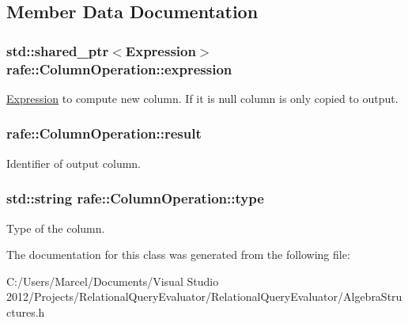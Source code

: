\subsection{Member Data Documentation}
\hypertarget{classrafe_1_1_column_operation_a33bfeb4554709f96d9945cb2148f095b}{
\subsubsection[{expression}]{\setlength{\rightskip}{0pt plus 5cm}std\+::shared\+\_\+ptr$<${\bf Expression}$>$ rafe\+::\+Column\+Operation\+::expression}}\label{classrafe_1_1_column_operation_a33bfeb4554709f96d9945cb2148f095b}
\hyperlink{classrafe_1_1_expression}{Expression} to compute new column. If it is null column is only copied to output. \hypertarget{classrafe_1_1_column_operation_a728c264bef7363a5bf0578c49654ea3b}{
\subsubsection[{result}]{ rafe\+::\+Column\+Operation\+::result}}\label{classrafe_1_1_column_operation_a728c264bef7363a5bf0578c49654ea3b}
Identifier of output column. \hypertarget{classrafe_1_1_column_operation_a1c85fd1a1f9465b33553cbdd6e641a51}{
\subsubsection[{type}]{\setlength{\rightskip}{0pt plus 5cm}std\+::string rafe\+::\+Column\+Operation\+::type}}\label{classrafe_1_1_column_operation_a1c85fd1a1f9465b33553cbdd6e641a51}
Type of the column. 

The documentation for this class was generated from the following file\+:\begin{DoxyCompactItemize}
\item 
C\+:/\+Users/\+Marcel/\+Documents/\+Visual Studio 2012/\+Projects/\+Relational\+Query\+Evaluator/\+Relational\+Query\+Evaluator/Algebra\+Structures.\+h\end{DoxyCompactItemize}
